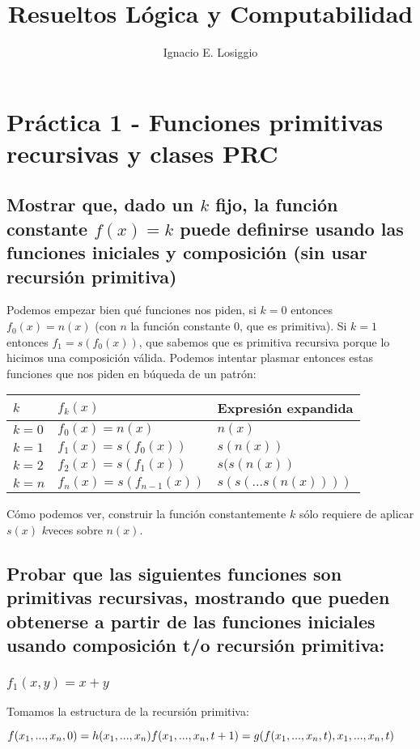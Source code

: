 \documentclass[11pt]{article} %
\title{Resueltos Lógica y Computabilidad}
\author{Ignacio E. Losiggio}
\newcommand{\desarrollo}[1]{

    \hspace{2em}
    \begin{minipage}{\textwidth}
        #1
    \end{minipage}

}
\begin{document}
\maketitle

\section{Práctica 1 - Funciones primitivas recursivas y clases PRC}

\subsection{Mostrar que, dado un $k$ fijo, la función constante $f(x)=k$ puede definirse usando las funciones iniciales y composición (sin usar recursión primitiva)}

Podemos empezar bien qué funciones nos piden, si $k = 0$  entonces $f_0(x)=n(x)$ (con $n$ la función constante $0$, que es primitiva). Si $k = 1$ entonces $f_1 = s(f_0(x))$, que sabemos que es primitiva recursiva porque lo hicimos una composición válida. Podemos intentar plasmar entonces estas funciones que nos piden en búqueda de un patrón:
\desarrollo{
\begin{tabular}{lll}
$k$     & $f_k(x)$                 & Expresión expandida \\ \hline
$k = 0$ & $f_0(x) = n(x)$          & $n(x)$ \\
$k = 1$ & $f_1(x) = s(f_0(x))$     & $s(n(x))$ \\
$k = 2$ & $f_2(x) = s(f_1(x))$     & $s(s(n(x))$ \\
$k = n$ & $f_n(x) = s(f_{n-1}(x))$ & $s(s(...s(n(x))))$ \\
\end{tabular}
}
Cómo podemos ver, construir la función constantemente $k$ sólo requiere de aplicar $s(x)$ $k$veces sobre $n(x)$.

\subsection{Probar que las siguientes funciones son primitivas recursivas, mostrando que pueden obtenerse a partir de las funciones iniciales usando composición t/o recursión primitiva:}

\subsubsection{$f_1(x,y)=x+y$}

Tomamos la estructura de la recursión primitiva:
\desarrollo{$
f(x_1,...,x_n,0)   = h(x_1,...,x_n) \\
f(x_1,...,x_n,t+1) = g(f(x_1,...,x_n,t),x_1,...,x_n,t)
$}
\end{document}
